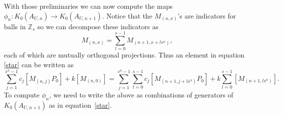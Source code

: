 \documentclass[10pt,a4paper]{amsart}
\newcommand{\Z}{{\mathbb Z}}
\numberwithin{equation}{section}
\begin{document}
With those preliminaries we can now compute the maps $\phi_n \colon K_0(A_{U,n}) \to K_0(A_{U,n+1})$. Notice that the $M_{(n,x)}$'s are indicators for balls in $\Z_s$ so we can decompose these indicators as
\begin{equation*}
M_{(n,x)} = \sum_{l=0}^{s-1} M_{(n+1,x+ls^n)},
\end{equation*}
each of which are mutually orthogonal projections. Thus an element in equation \eqref{star} can be written as
\begin{equation}
\sum_{j=1}^{s^n-1} c_j[M_{(n,j)}P_0] + k[M_{(n,0)}] =
\sum_{j=1}^{s^n-1} \sum_{l=0}^{s-1} c_j [M_{(n+1,j+ls^n)}P_0] + k \sum_{l=0}^{s-1} [M_{(n+1,ls^n)}].\label{starstar}
\end{equation}
To compute $\phi_n$, we need to write the above as combinations of generators of $K_0(A_{U,n+1})$ as in equation~\eqref{star}.
\end{document}
